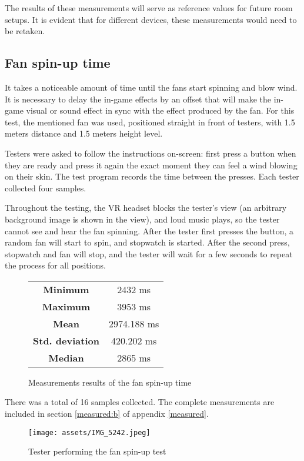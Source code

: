 The results of these measurements will serve as reference values for future
room setups. It is evident that for different devices, these measurements
would need to be retaken.


\hypertarget{x-fan-spin-up-time}{\subsection{Fan spin-up time}}
It takes a noticeable amount of time until the fans start spinning and
blow wind. It is necessary to delay the in-game effects by an offset that
will make the in-game visual or sound effect in sync with the effect
produced by the fan.
For this test, the mentioned fan was used, positioned straight in front of
testers, with 1.5 meters distance and 1.5 meters height level.


Testers were asked to follow the instructions on-screen: first press a button
when they are ready and press it again the exact moment they can feel a wind
blowing on their skin. The test program records the time between the presses.
Each tester collected four samples.

Throughout the testing, the VR headset blocks the tester’s view (an arbitrary
background image is shown in the view), and loud music plays, so the tester
cannot see and hear the fan spinning. After the tester first presses the button,
a random fan will start to spin, and stopwatch is started. After the second
press, stopwatch and fan will stop, and the tester will wait for a few seconds
to repeat the process for all positions.

\begin{figure}[H]
\centering
\begin{tabular}{|c|c|}
\hline
\textbf{Minimum} & 2432 ms \\ 
\textbf{Maximum} & 3953 ms \\ 
\textbf{Mean} & 2974.188 ms \\ 
\textbf{Std. deviation} & 420.202 ms \\ 
\textbf{Median} & 2865 ms \\ 
\hline
\end{tabular}
\caption{Measurements results of the fan spin-up time}
\end{figure}

There was a total of 16 samples collected. The complete measurements are included 
in section \ref{measured:b} of appendix \ref{measured}.

\begin{figure}[h]{}
\centering\texttt{[image: assets/IMG\_5242.jpeg]}
\caption{Tester performing the fan spin-up test}
\end{figure}

